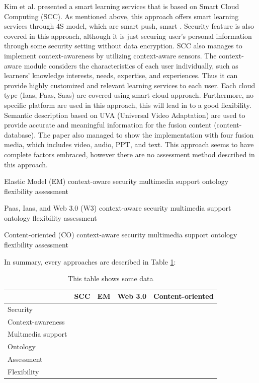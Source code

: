 \documentclass[journal]{vgtc}                %
\begin{document}
Kim et al. presented a smart learning services that is based on Smart Cloud Computing (SCC). As mentioned above, this approach offers smart learning services through 4S model, which are smart push, smart . Security feature is also covered in this approach, although it is just securing user's personal information through some security setting without data encryption. SCC also manages to implement context-awareness by utilizing context-aware sensors. The context-aware module considers the characteristics of each user individually, such as learners’ knowledge interests, needs, expertise, and experiences. Thus it can provide highly customized and relevant learning services to each user. Each cloud type (Iaas, Paas, Saas) are covered using smart cloud approach. Furthermore, no specific platform are used in this approach, this will lead in to a good flexibility. Semantic description based on UVA (Universal Video Adaptation) are used to provide accurate and meaningful information for the fusion content (content-database). The paper also managed to show the implementation with four fusion media, which includes video, audio, PPT, and text. This approach seems to have complete factors embraced, however there are no assessment method described in this approach.

Elastic Model (EM)
context-aware
security
multimedia support
ontology
flexibility
assessment

Paas, Iaas, and Web 3.0 (W3)
context-aware
security
multimedia support
ontology
flexibility
assessment

Content-oriented (CO)
context-aware
security
multimedia support
ontology
flexibility
assessment


In summary, every approaches are described in Table \ref{tab:comparison}:

\begin{table}[htb]
  \caption{This table shows some data}
  \label{tab:comparison}
  \scriptsize
  \begin{center}
  \begin{tabular}{lcccc}
     & SCC & EM & Web 3.0 & Content-oriented \\
    \hline
    Security &  &  &  &  \\
    Context-awareness &  &  &  &  \\
    Multmedia support &  &  &  &  \\
    Ontology &  &  &  &  \\
    Assessment &  &  &  &  \\
    Flexibility &  &  &  & 
  \end{tabular}
  \end{center}
\end{table}
\end{document}
